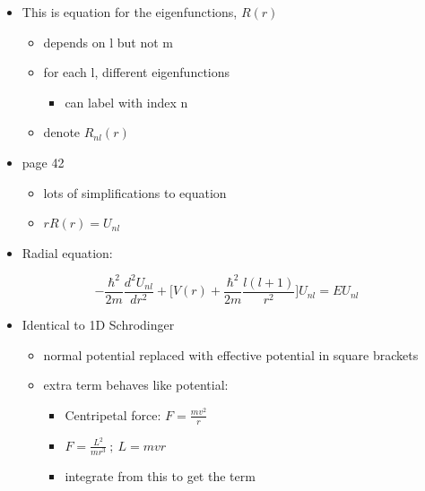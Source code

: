 \documentclass[a4paper,11pt,normalem]{article}
\begin{document}
\begin{itemize}
\item
  This is equation for the eigenfunctions, \(R(r)\)
  \begin{itemize}
  \item
    depends on l but not m
  \item
    for each l, different eigenfunctions
    \begin{itemize}
    \item
      can label with index n
    \end{itemize}
  \item
    denote \(R_{nl}(r)\)
  \end{itemize}
\item
  page 42
  \begin{itemize}
  \item
    lots of simplifications to equation
  \item
    \(rR(r) = U_{nl}\)
  \end{itemize}
\item
  Radial equation:
\end{itemize}
\[
    -\frac{\hbar^2}{2m}\frac{d^2 U_{nl}}{dr^2} + \Bigg[V(r) + \frac{\hbar^2}{2m}\frac{l(l + 1)}{r^2} \Bigg]U_{nl} = EU_{nl}
\]
\begin{itemize}
\item
  Identical to 1D Schrodinger
  \begin{itemize}
  \item
    normal potential replaced with effective potential in square
    brackets
  \item
    extra term behaves like potential:
    \begin{itemize}
    \item
      Centripetal force: \(F = \frac{mv^2}{r}\)
    \item
      \(F = \frac{L^2}{mr^3} ~;~ L = mvr\)
    \item
      integrate from this to get the term
    \end{itemize}
  \end{itemize}
\end{itemize}
\end{document}
